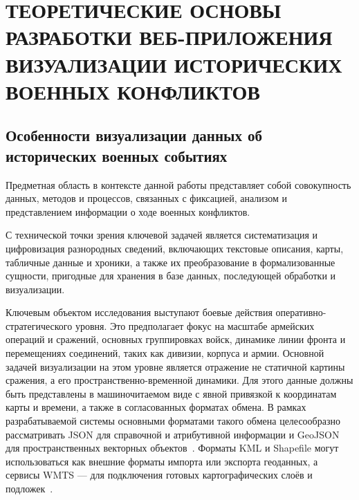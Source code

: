 \chapter{ТЕОРЕТИЧЕСКИЕ ОСНОВЫ РАЗРАБОТКИ ВЕБ-ПРИЛОЖЕНИЯ ВИЗУАЛИЗАЦИИ ИСТОРИЧЕСКИХ ВОЕННЫХ КОНФЛИКТОВ}

\section{Особенности визуализации данных об исторических военных событиях}

Предметная область в контексте данной работы представляет собой совокупность данных, методов и процессов, связанных с фиксацией, анализом и представлением информации о ходе военных конфликтов.

С технической точки зрения ключевой задачей является систематизация и цифровизация разнородных сведений, включающих текстовые описания, карты, табличные данные и хроники, а также их преобразование в формализованные сущности, пригодные для хранения в базе данных, последующей обработки и визуализации.

Ключевым объектом исследования выступают боевые действия оперативно-стратегического уровня. Это предполагает фокус на масштабе армейских операций и сражений, основных группировках войск, динамике линии фронта и перемещениях соединений, таких как дивизии, корпуса и армии. Основной задачей визуализации на этом уровне является отражение не статичной картины сражения, а его пространственно-временной динамики. Для этого данные должны быть представлены в машиночитаемом виде с явной привязкой к координатам карты и времени, а также в согласованных форматах обмена. В рамках разрабатываемой системы основными форматами такого обмена целесообразно рассматривать JSON для справочной и атрибутивной информации и GeoJSON для пространственных векторных объектов~\cite{rfc7946}. Форматы KML и Shapefile могут использоваться как внешние форматы импорта или экспорта геоданных, а сервисы WMTS --- для подключения готовых картографических слоёв и подложек~\cite{ogc_wmts}.

